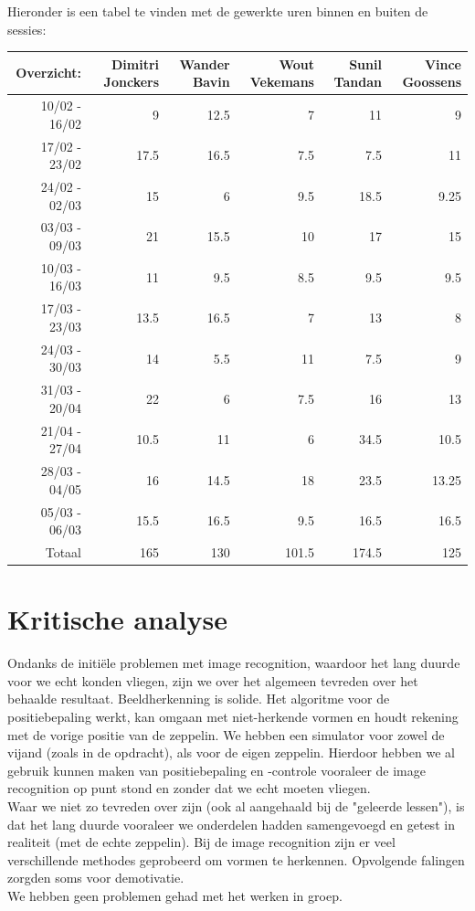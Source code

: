 \documentclass[eind]{penoverslag}
\begin{document}
Hieronder is een tabel te vinden met de gewerkte uren binnen en buiten de sessies: \\

\begin{tabular}{r||r|r|r|r|r}
Overzicht: & Dimitri Jonckers & Wander Bavin & Wout Vekemans & Sunil Tandan & Vince Goossens \\
\hline \hline
10/02 - 16/02 & 9 & 12.5 & 7 & 11 & 9 \\
17/02 - 23/02 & 17.5 & 16.5 & 7.5 & 7.5 & 11 \\
24/02 - 02/03 & 15 & 6 & 9.5 & 18.5 & 9.25 \\
03/03 - 09/03 & 21 & 15.5 & 10 & 17 & 15 \\
10/03 - 16/03 & 11 & 9.5 & 8.5 & 9.5 & 9.5 \\
17/03 - 23/03 & 13.5 & 16.5 & 7 & 13 & 8 \\
24/03 - 30/03 & 14 & 5.5 & 11 & 7.5 & 9 \\
31/03 - 20/04 & 22 & 6 & 7.5 & 16 & 13 \\
21/04 - 27/04 & 10.5 & 11 & 6 & 34.5 & 10.5 \\
28/03 - 04/05 & 16 & 14.5 & 18 & 23.5 & 13.25 \\
05/03 - 06/03 & 15.5 & 16.5 & 9.5 & 16.5 & 16.5 \\
\hline \hline
Totaal & 165 & 130 & 101.5 & 174.5 & 125 \\
\end{tabular}


\section{Kritische analyse}
Ondanks de initi\"ele problemen met image recognition, waardoor het lang duurde voor we echt konden vliegen, zijn we over het algemeen tevreden over het behaalde resultaat. Beeldherkenning is solide. Het algoritme voor de positiebepaling werkt, kan omgaan met niet-herkende vormen en houdt rekening met de vorige positie van de zeppelin. We hebben een simulator voor zowel de vijand (zoals in de opdracht), als voor de eigen zeppelin. Hierdoor hebben we al gebruik kunnen maken van positiebepaling en -controle vooraleer de image recognition op punt stond en zonder dat we echt moeten vliegen. \\

Waar we niet zo tevreden over zijn (ook al aangehaald bij de "geleerde lessen"), is dat het lang duurde vooraleer we onderdelen hadden samengevoegd en getest in realiteit (met de echte zeppelin). Bij de image recognition zijn er veel verschillende methodes geprobeerd om vormen te herkennen. Opvolgende falingen zorgden soms voor demotivatie. \\

We hebben geen problemen gehad met het werken in groep.
\end{document}
